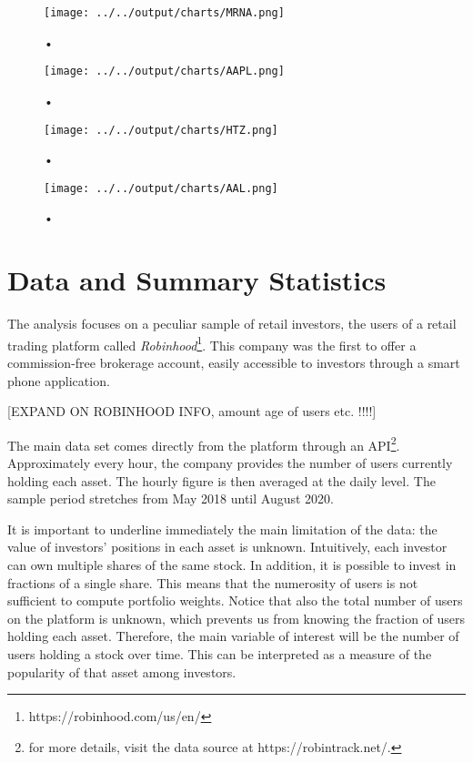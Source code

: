 \documentclass[12pt]{article}
\numberwithin{equation}{section} %
\begin{document}
\begin{figure}[h!]
\caption{•}
\centering
\texttt{[image: ../../output/charts/MRNA.png]}
\end{figure}

\begin{figure}[h!]
\caption{•}
\centering
\texttt{[image: ../../output/charts/AAPL.png]}
\end{figure}

\begin{figure}[h!]
\caption{•}
\centering
\texttt{[image: ../../output/charts/HTZ.png]}
\end{figure}

\begin{figure}[h!]
\caption{•}
\centering
\texttt{[image: ../../output/charts/AAL.png]}
\end{figure}


\section{Data and Summary Statistics}

The analysis focuses on a peculiar sample of retail investors, the users of a retail trading platform called \textit{Robinhood}\footnote{https://robinhood.com/us/en/}. This company was the first to offer a commission-free brokerage account, easily accessible to investors through a smart phone application. 

[EXPAND ON ROBINHOOD INFO, amount age of users etc. !!!!]


The main data set comes directly from the platform through an API\footnote{for more details, visit the data source at https://robintrack.net/.}. Approximately every hour, the company provides the number of users currently holding each asset. The hourly figure is then averaged at the daily level. The sample period stretches from May 2018 until August 2020.

It is important to underline immediately the main limitation of the data: the value of investors' positions in each asset is unknown. Intuitively, each investor can own multiple shares of the same stock. In addition, it is possible to invest in fractions of a single share. This means that the numerosity of users is not sufficient to compute portfolio weights. Notice that also the total number of users on the platform is unknown, which prevents us from knowing the fraction of users holding each asset. Therefore, the main variable of interest will be the number of users holding a stock over time. This can be interpreted as a measure of the popularity of that asset among investors.
\end{document}
